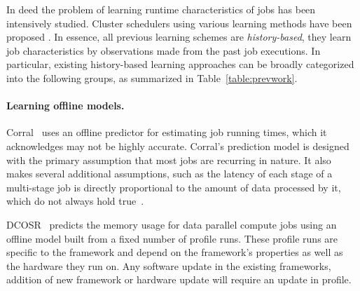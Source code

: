 In deed the problem of learning runtime characteristics of jobs has been intensively
studied.  Cluster schedulers using various learning methods have been proposed
\cite{corral, morpheus, shufflewatcher, 3Sigma, tetrisched,
DontCryOverSpilledRecords, perforator:socc2016, Apollo:osdi2014, wsmith:IEEE98, stratus:socc2018, roughSetEstimation:IEEE:Shonali}.  
In essence, all previous learning schemes
are {\em history-based}, \ie they learn job characteristics by observations
made from the past job executions. In particular, existing history-based
learning approaches can be broadly categorized into the following groups, as
summarized in Table~\ref{table:prevwork}.




\paragraph{Learning offline models.}
Corral~\cite{corral} uses an offline predictor for estimating job running
times, which it acknowledges may not be highly accurate.
\fi
Corral's prediction model is designed with the primary assumption that most
jobs are recurring in nature. It also makes several additional assumptions,
such as the latency of each stage of a multi-stage job is directly proportional
to the amount of data processed by it, which do not always hold true~\cite{corral}.

DCOSR~\cite{DontCryOverSpilledRecords} predicts the memory usage for
data parallel compute jobs using an offline model built from a fixed
number of profile runs.  These profile runs are specific to the
framework and depend on the  framework's properties as well as the
hardware they run on. Any software update in the existing frameworks,
addition of new framework or hardware update will require an update in
profile.

